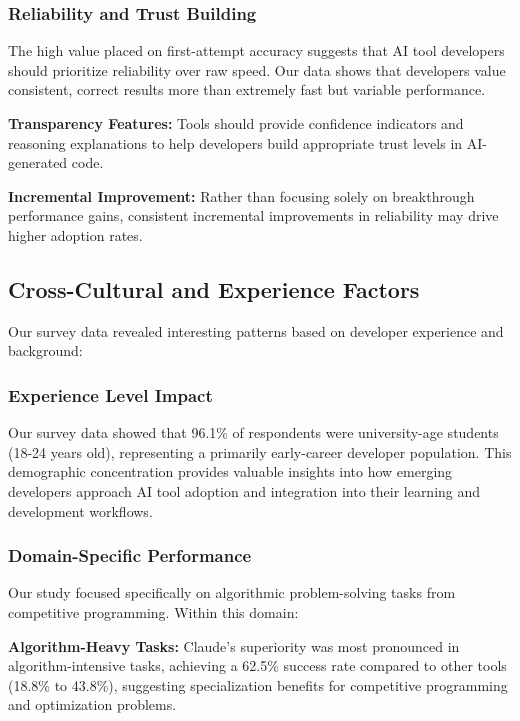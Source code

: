 \documentclass[conference]{IEEEtran}
\begin{document}
\subsubsection{Reliability and Trust Building}

The high value placed on first-attempt accuracy suggests that AI tool developers should prioritize reliability over raw speed. Our data shows that developers value consistent, correct results more than extremely fast but variable performance.

\textbf{Transparency Features:} Tools should provide confidence indicators and reasoning explanations to help developers build appropriate trust levels in AI-generated code.

\textbf{Incremental Improvement:} Rather than focusing solely on breakthrough performance gains, consistent incremental improvements in reliability may drive higher adoption rates.

\subsection{Cross-Cultural and Experience Factors}

Our survey data revealed interesting patterns based on developer experience and background:

\subsubsection{Experience Level Impact}

Our survey data showed that 96.1\% of respondents were university-age students (18-24 years old), representing a primarily early-career developer population. This demographic concentration provides valuable insights into how emerging developers approach AI tool adoption and integration into their learning and development workflows.

\subsubsection{Domain-Specific Performance}

Our study focused specifically on algorithmic problem-solving tasks from competitive programming. Within this domain:

\textbf{Algorithm-Heavy Tasks:} Claude's superiority was most pronounced in algorithm-intensive tasks, achieving a 62.5\% success rate compared to other tools (18.8\% to 43.8\%), suggesting specialization benefits for competitive programming and optimization problems.
\end{document}

